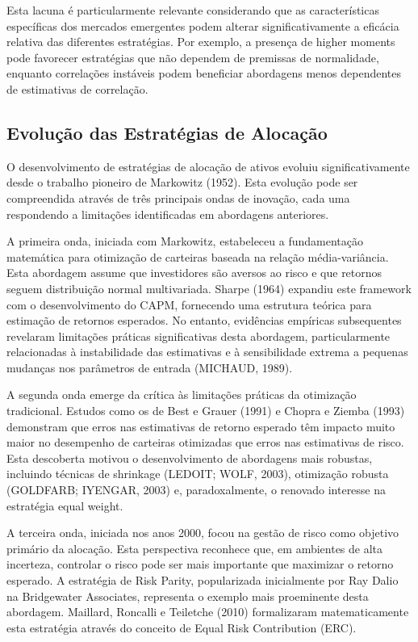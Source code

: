 Esta lacuna é particularmente relevante considerando que as características específicas dos mercados emergentes podem alterar significativamente a eficácia relativa das diferentes estratégias. Por exemplo, a presença de higher moments pode favorecer estratégias que não dependem de premissas de normalidade, enquanto correlações instáveis podem beneficiar abordagens menos dependentes de estimativas de correlação.

\subsection{Evolução das Estratégias de Alocação}

O desenvolvimento de estratégias de alocação de ativos evoluiu significativamente desde o trabalho pioneiro de Markowitz (1952). Esta evolução pode ser compreendida através de três principais ondas de inovação, cada uma respondendo a limitações identificadas em abordagens anteriores.

A primeira onda, iniciada com Markowitz, estabeleceu a fundamentação matemática para otimização de carteiras baseada na relação média-variância. Esta abordagem assume que investidores são aversos ao risco e que retornos seguem distribuição normal multivariada. Sharpe (1964) expandiu este framework com o desenvolvimento do CAPM, fornecendo uma estrutura teórica para estimação de retornos esperados. No entanto, evidências empíricas subsequentes revelaram limitações práticas significativas desta abordagem, particularmente relacionadas à instabilidade das estimativas e à sensibilidade extrema a pequenas mudanças nos parâmetros de entrada (MICHAUD, 1989).

A segunda onda emerge da crítica às limitações práticas da otimização tradicional. Estudos como os de Best e Grauer (1991) e Chopra e Ziemba (1993) demonstram que erros nas estimativas de retorno esperado têm impacto muito maior no desempenho de carteiras otimizadas que erros nas estimativas de risco. Esta descoberta motivou o desenvolvimento de abordagens mais robustas, incluindo técnicas de shrinkage (LEDOIT; WOLF, 2003), otimização robusta (GOLDFARB; IYENGAR, 2003) e, paradoxalmente, o renovado interesse na estratégia equal weight.

A terceira onda, iniciada nos anos 2000, focou na gestão de risco como objetivo primário da alocação. Esta perspectiva reconhece que, em ambientes de alta incerteza, controlar o risco pode ser mais importante que maximizar o retorno esperado. A estratégia de Risk Parity, popularizada inicialmente por Ray Dalio na Bridgewater Associates, representa o exemplo mais proeminente desta abordagem. Maillard, Roncalli e Teiletche (2010) formalizaram matematicamente esta estratégia através do conceito de Equal Risk Contribution (ERC).

